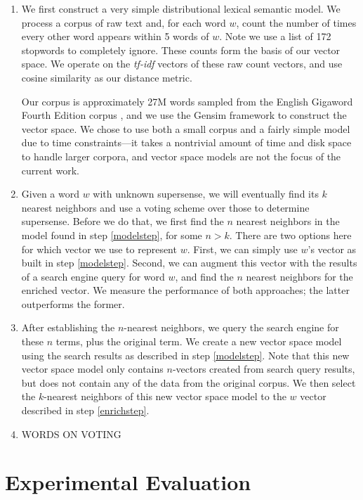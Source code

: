 \documentclass{article}
\begin{document}
\begin{enumerate}
\item\label{modelstep}
We first construct a very simple distributional lexical semantic model.
We process a corpus of raw text and, for each word $w$, count the number of times every other word appears within 5 words of $w$.
Note we use a list of 172 stopwords to completely ignore.
These counts form the basis of our vector space.
We operate on the {\it tf-idf} vectors of these raw count vectors, and use cosine similarity as our distance metric.

Our corpus is approximately 27M words sampled from the English Gigaword Fourth Edition corpus \cite{gigaword}, and we use the Gensim framework \cite{gensim} to construct the vector space.
We chose to use both a small corpus and a fairly simple model due to time constraints---it takes a nontrivial amount of time and disk space to handle larger corpora, and vector space models are not the focus of the current work.

\item \label{enrichstep}
Given a word $w$ with unknown supersense, we will eventually find its $k$ nearest neighbors and use a voting scheme over those to determine supersense.
Before we do that, we first find the $n$ nearest neighbors in the model found in step \ref{modelstep}, for some $n > k$.
There are two options here for which vector we use to represent $w$.
First, we can simply use $w$'s vector as built in step \ref{modelstep}.
Second, we can augment this vector with the results of a search engine query for word $w$, and find the $n$ nearest neighbors for the enriched vector.
We measure the performance of both approaches; the latter outperforms the former.

\item
After establishing the $n$-nearest neighbors, we query the search engine for these $n$ terms, plus the original term. We create a new vector space model using the search results as described in step \ref{modelstep}. Note that this new vector space model only contains $n$-vectors created from search query results, but does not contain any of the data from the original corpus. We then select the $k$-nearest neighbors of this new vector space model to the $w$ vector described in step \ref{enrichstep}.

\item
WORDS ON VOTING

\end{enumerate}

\section{Experimental Evaluation}
\end{document}
